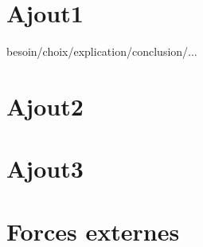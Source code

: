 % 
        

        \section{Ajout1}
besoin/choix/explication/conclusion/...
        \section{Ajout2}

        \section{Ajout3}
        \section{Forces externes}
